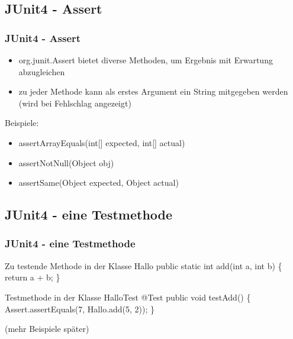 \documentclass[18pt]{beamer}
\begin{document}
	\subsection{JUnit4 - Assert}
	\begin{frame}
		\frametitle{JUnit4 - Assert}
		\begin{itemize}
			\item org.junit.Assert bietet diverse Methoden, um Ergebnis mit Erwartung abzugleichen 
			\item zu jeder Methode kann als erstes Argument ein String mitgegeben werden (wird bei Fehlschlag angezeigt) \linebreak
		\end{itemize}
		Beispiele:
		\begin{itemize}
			\item assertArrayEquals(int[] expected, int[] actual)
			\item assertNotNull(Object obj)
			\item assertSame(Object expected, Object actual)
		\end{itemize}
	\end{frame}
	
	\subsection{JUnit4 - eine Testmethode}
	\begin{frame}
		\frametitle{JUnit4 - eine Testmethode}
		\begin{block}{Zu testende Methode in der Klasse Hallo}
				public static int add(int a, int b) \{ \linebreak
					 return a + b; \linebreak
				      \}	
		\end{block} 
		\begin{block}{Testmethode in der Klasse HalloTest}
			@Test\linebreak
			public void testAdd() \{ \linebreak
				Assert.assertEquals(7, Hallo.add(5, 2)); \linebreak
			\}
		\end{block}
		(mehr Beispiele später)
	\end{frame}
	
\end{document}
